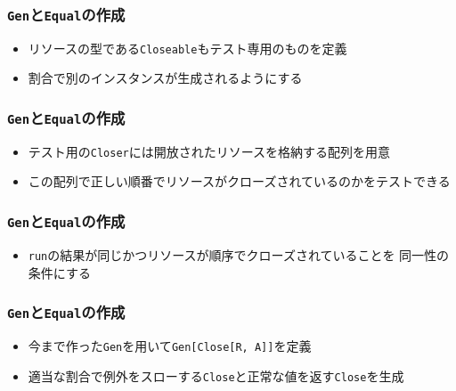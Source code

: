 \begin{frame}
  \frametitle{\protect\lstinline|Gen|と\protect\lstinline|Equal|の作成}

  
  

  \begin{itemize}
    \item<2-> リソースの型である\lstinline|Closeable|もテスト専用のものを定義
    \item<3-> 割合で別のインスタンスが生成されるようにする
  \end{itemize}
\end{frame}

\begin{frame}
  \frametitle{\protect\lstinline|Gen|と\protect\lstinline|Equal|の作成}

  
  

  \begin{itemize}
    \item<2-> テスト用の\lstinline|Closer|には開放されたリソースを格納する配列を用意
    \item<3-> この配列で正しい順番でリソースがクローズされているのかをテストできる
  \end{itemize}
\end{frame}

\begin{frame}
  \frametitle{\protect\lstinline|Gen|と\protect\lstinline|Equal|の作成}

  

  \begin{itemize}
    \item<2-> \lstinline|run|の結果が同じかつリソースが順序でクローズされていることを
    同一性の条件にする
  \end{itemize}
\end{frame}

\begin{frame}
  \frametitle{\protect\lstinline|Gen|と\protect\lstinline|Equal|の作成}

  

  \begin{itemize}
    \item<2-> 今まで作った\lstinline|Gen|を用いて\lstinline|Gen[Close[R, A]]|を定義
    \item<3-> 適当な割合で例外をスローする\lstinline|Close|と正常な値を返す\lstinline|Close|を生成
  \end{itemize}
\end{frame}

